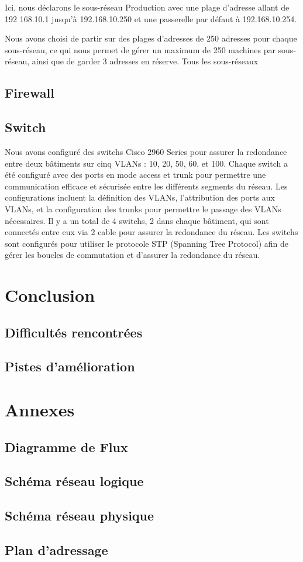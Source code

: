 \documentclass[a4paper,12pt]{report}
\begin{document}
                Ici, nous déclarons le sous-réseau Production avec une plage d'adresse allant de 192
                168.10.1 jusqu'à 192.168.10.250 et une passerelle par défaut à 192.168.10.254.

                Nous avons choisi de partir sur des plages d'adresses de 250 adresses pour chaque sous-réseau, ce qui nous permet de gérer un maximum de 250 machines par sous-réseau, ainsi que de garder 3 adresses en réserve.
                Tous les sous-réseaux 



        \section{Firewall}
        \section{Switch}
        Nous avons configuré des switchs Cisco 2960 Series pour assurer la redondance entre deux bâtiments sur cinq VLANs : 10, 20, 50, 60, et 100. Chaque switch a été configuré avec des ports en mode access et trunk pour permettre une communication efficace et sécurisée entre les différents segments du réseau. Les configurations incluent la définition des VLANs, l'attribution des ports aux VLANs, et la configuration des trunks pour permettre le passage des VLANs nécessaires.
        Il y a un total de 4 switchs, 2 dans chaque bâtiment, qui sont connectés entre eux via 2 cable pour assurer la redondance du réseau. Les switchs sont configurés pour utiliser le protocole STP (Spanning Tree Protocol) afin de gérer les boucles de commutation et d'assurer la redondance du réseau.
    \chapter{Conclusion}
        \section{Difficultés rencontrées}
        \section{Pistes d'amélioration}

    \chapter*{Annexes}
        \section{Diagramme de Flux}
        \section{Schéma réseau logique}
        \section{Schéma réseau physique}
        \section{Plan d'adressage}
        
\end{document}
